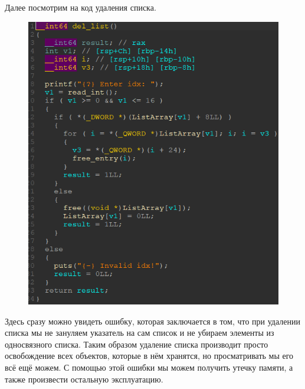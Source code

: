 \documentclass[idxtotoc,hyperref,openany,oneside]{files/pwn} %
\begin{document}
Далее посмотрим на код удаления списка.
\begin{figure}[H]
\begin{center}
\includegraphics[width=1.0\linewidth]{files/mal-del-list}
\end{center}
\label{fig:mal-del-list}
\end{figure}

Здесь сразу можно увидеть ошибку, которая заключается в том, что при удалении списка мы не зануляем указатель на сам список и не убираем элементы из односвязного списка. Таким образом удаление списка производит просто освобождение всех объектов, которые в нём хранятся, но просматривать мы его всё ещё можем. С помощью этой ошибки мы можем получить утечку памяти, а также произвести остальную эксплуатацию.
\end{document}
